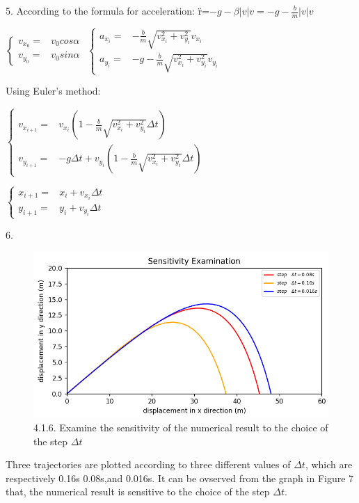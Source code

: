 \documentclass{book}
\begin{document}
\vspace{0.01\textheight}
{\Large 5.} According to the formula for acceleration: {\"r}=$-g-\beta |v|v=-g-\frac{b}{m}|v|v$

$\begin{cases}
    v_{x_{0}}= & v_{0}cos\alpha \\

    v_{y_{0}}= & v_{0}sin\alpha
  \end{cases}$
\quad $
  \begin{cases}
    a_{x_{i}}= & -\frac{b}{m} \sqrt{v_{x_{i}}^{2}+v_{y_{i}}^{2}}v_{x_{i}}   \\

    a_{y_{i}}= & -g-\frac{b}{m} \sqrt{v_{x_{i}}^{2}+v_{y_{i}}^{2}}v_{y_{i}}
  \end{cases}
$

\vspace{0.01\textheight}
Using Euler's method:
\vspace{0.01\textheight}

$\begin{cases}
    v_{x_{i+1}}= & v_{x_{i}}(1-\frac{b}{m}\sqrt{v_{x_{i}}^{2}+v_{y_{i}}^{2}}\Delta t)            \\

    v_{y_{i+1}}= & -g\Delta t+v_{y_{i}}(1-\frac{b}{m}\sqrt{v_{x_{i}}^{2}+v_{y_{i}}^{2}}\Delta t)
  \end{cases}$

\vspace{0.006\textheight}
$
  \begin{cases}
    x_{i+1}= & x_{i}+v_{x_{i}}\Delta t \\

    y_{i+1}= & y_{i}+v_{y_{i}}\Delta t
  \end{cases}
$

\newpage
{\Large 6.}
\begin{figure}[H]
  \centering
  \includegraphics[scale=0.6]{./graphs/project4.1.6.png}
  \caption{4.1.6. Examine the sensitivity of the numerical result to the choice of the step $\Delta t$}
\end{figure}
Three trajectories are plotted according to three different values of {$\Delta t$}, which are respectively 0.16s 0.08s,and 0.016s.
It can be ovserved from the graph in Figure 7 that, the numerical result is sensitive to the choice of the step {$\Delta t$}.
\end{document}
